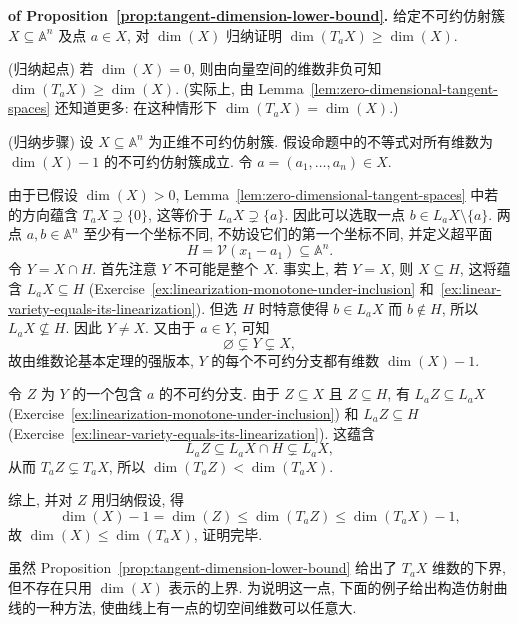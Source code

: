 \begin{Proof}\textbf{of Proposition~\ref{prop:tangent-dimension-lower-bound}.}\quad
给定不可约仿射簇 $X\subseteq\mathbb{A}^{n}$ 及点 $a\in X$, 对 $\dim(X)$ 归纳证明 $\dim(T_{a}X)\geq\dim(X)$.

(归纳起点) 若 $\dim(X)=0$, 则由向量空间的维数非负可知 $\dim(T_{a}X)\geq\dim(X)$. (实际上, 由 Lemma~\ref{lem:zero-dimensional-tangent-spaces} 还知道更多: 在这种情形下 $\dim(T_{a}X)=\dim(X)$.)

(归纳步骤) 设 $X\subseteq\mathbb{A}^{n}$ 为正维不可约仿射簇. 假设命题中的不等式对所有维数为 $\dim(X)-1$ 的不可约仿射簇成立. 令 $a=(a_{1},\ldots,a_{n})\in X$.

由于已假设 $\dim(X)>0$, Lemma~\ref{lem:zero-dimensional-tangent-spaces} 中\textquotedbl{}若\textquotedbl{}的方向蕴含 $T_{a}X\supsetneq\{0\}$, 这等价于 $L_{a}X\supsetneq\{a\}$. 因此可以选取一点 $b\in L_{a}X\setminus\{a\}$. 两点 $a,b\in\mathbb{A}^{n}$ 至少有一个坐标不同, 不妨设它们的第一个坐标不同, 并定义超平面
\[
  H=\mathcal{V}(x_{1}-a_{1})\subseteq\mathbb{A}^{n}.
\]
令 $Y=X\cap H$. 首先注意 $Y$ 不可能是整个 $X$. 事实上, 若 $Y=X$, 则 $X\subseteq H$, 这将蕴含 $L_{a}X\subseteq H$ (Exercise~\ref{ex:linearization-monotone-under-inclusion} 和~\ref{ex:linear-variety-equals-its-linearization}). 但选 $H$ 时特意使得 $b\in L_{a}X$ 而 $b\notin H$, 所以 $L_{a}X\not\subseteq H$. 因此 $Y\neq X$. 又由于 $a\in Y$, 可知
\begin{equation}\label{eq:tangent-lower-bound-proper-slice}
  \varnothing\subsetneq Y\subsetneq X,
\end{equation}
故由维数论基本定理的强版本, $Y$ 的每个不可约分支都有维数 $\dim(X)-1$.

令 $Z$ 为 $Y$ 的一个包含 $a$ 的不可约分支. 由于 $Z\subseteq X$ 且 $Z\subseteq H$, 有 $L_{a}Z\subseteq L_{a}X$ (Exercise~\ref{ex:linearization-monotone-under-inclusion}) 和 $L_{a}Z\subseteq H$ (Exercise~\ref{ex:linear-variety-equals-its-linearization}). 这蕴含
\begin{equation}\label{eq:tangent-lower-bound-linearized-slice}
  L_{a}Z\subseteq L_{a}X\cap H\subsetneq L_{a}X,
\end{equation}
从而 $T_{a}Z\subsetneq T_{a}X$, 所以 $\dim(T_{a}Z)<\dim(T_{a}X)$.

综上, 并对 $Z$ 用归纳假设, 得
\[
  \dim(X)-1=\dim(Z)\leq\dim(T_{a}Z)\leq\dim(T_{a}X)-1,
\]
故 $\dim(X)\leq\dim(T_{a}X)$, 证明完毕.
\end{Proof}

虽然 Proposition~\ref{prop:tangent-dimension-lower-bound} 给出了 $T_{a}X$ 维数的下界, 但不存在只用 $\dim(X)$ 表示的上界. 为说明这一点, 下面的例子给出构造仿射曲线的一种方法, 使曲线上有一点的切空间维数可以任意大.

